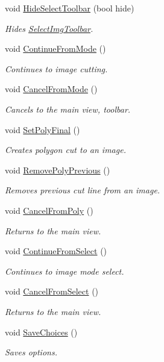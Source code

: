 \begin{DoxyCompactItemize}
void \mbox{\hyperlink{classGUI_a7f6d3b1fcbd874fccd93c5f29c468ed8}{Hide\+Select\+Toolbar}} (bool hide)
\begin{DoxyCompactList}\small\item\em Hides \mbox{\hyperlink{structSelectImgToolbar}{Select\+Img\+Toolbar}}. \end{DoxyCompactList}\item 
void \mbox{\hyperlink{classGUI_a3547730e0fae81b59fcb19d00a370782}{Continue\+From\+Mode}} ()
\begin{DoxyCompactList}\small\item\em Continues to image cutting. \end{DoxyCompactList}\item 
void \mbox{\hyperlink{classGUI_a8188dd01b2dc9354afbbf2f4b18fd19a}{Cancel\+From\+Mode}} ()
\begin{DoxyCompactList}\small\item\em Cancels to the main view, toolbar. \end{DoxyCompactList}\item 
void \mbox{\hyperlink{classGUI_a6bf2d3ef382340365b5693245a2bd955}{Set\+Poly\+Final}} ()
\begin{DoxyCompactList}\small\item\em Creates polygon cut to an image. \end{DoxyCompactList}\item 
void \mbox{\hyperlink{classGUI_abf8e1050ae4d599bf35af7b1f841d960}{Remove\+Poly\+Previous}} ()
\begin{DoxyCompactList}\small\item\em Removes previous cut line from an image. \end{DoxyCompactList}\item 
void \mbox{\hyperlink{classGUI_a9f2b3abf533a7c720b817caed653da2e}{Cancel\+From\+Poly}} ()
\begin{DoxyCompactList}\small\item\em Returns to the main view. \end{DoxyCompactList}\item 
void \mbox{\hyperlink{classGUI_a0cddf3859f457495040857f4868f32e3}{Continue\+From\+Select}} ()
\begin{DoxyCompactList}\small\item\em Continues to image mode select. \end{DoxyCompactList}\item 
void \mbox{\hyperlink{classGUI_a3e6d9c2c9482bf8cb9655899b36e8bc1}{Cancel\+From\+Select}} ()
\begin{DoxyCompactList}\small\item\em Returns to the main view. \end{DoxyCompactList}\item 
void \mbox{\hyperlink{classGUI_a00fb847ea0a8249acaaf70c0f3ba3fd4}{Save\+Choices}} ()
\begin{DoxyCompactList}\small\item\em Saves options. \end{DoxyCompactList}\end{DoxyCompactItemize}


